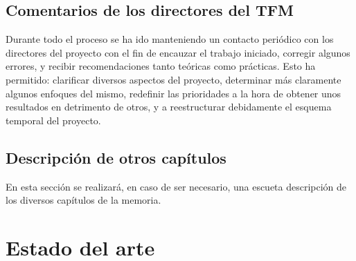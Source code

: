 \documentclass[IB,BIB]{TFUOC}%
\begin{document}
\normalsize


\section{Comentarios de los directores del TFM}
\label{sec:Comentarios de los directores del TFM}

Durante todo el proceso se ha ido manteniendo un contacto periódico con los directores del proyecto con el fin de encauzar el trabajo iniciado, corregir algunos errores, y recibir recomendaciones tanto teóricas como prácticas. Esto ha permitido: clarificar diversos aspectos del proyecto, determinar más claramente algunos enfoques del mismo, redefinir las prioridades a la hora de obtener unos resultados en detrimento de otros, y a reestructurar debidamente el esquema temporal del proyecto.


\section{Descripción de otros capítulos}
\label{sec:Descripción de otros capítulos}

En esta sección se realizará, en caso de ser necesario, una escueta descripción de los diversos capítulos de la memoria.







\chapter{Estado del arte}
\label{chap:Estado del arte}

%
%
\end{document}

